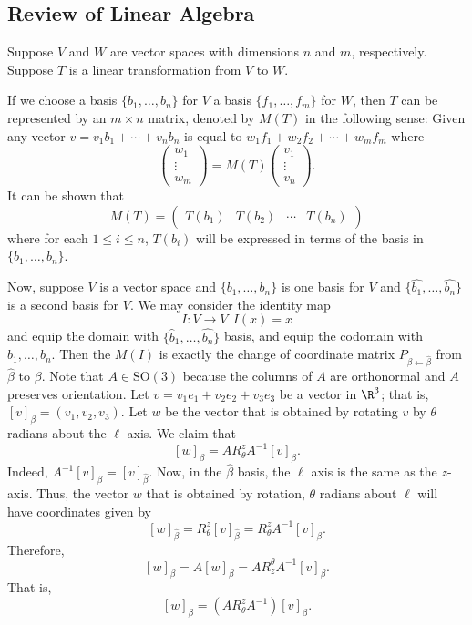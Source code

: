 \subsection{Review of Linear Algebra}

Suppose \( V  \) and \( W  \) are vector spaces with dimensions \( n  \) and \( m  \), respectively. Suppose \( T  \) is a linear transformation from \( V  \) to \( W  \). 

\begin{remark}
   If we choose a basis \(  \{  {b}_{1}, \dots, {b}_{n} \}  \) for \( V  \) a basis \( \{  {f}_{1}, \dots, {f}_{m} \}  \) for \( W  \), then \( T  \) can be represented by an \( m \times n  \) matrix, denoted by \( M(T) \) in the following sense: 
   Given any vector \( v = {v}_{1} {b}_{1} + \cdots + {v}_{n} {b}_{n} \) is equal to \( {w}_{1} {f}_{1} + {w}_{2} {f}_{2} + \cdots + {w}_{m} {f}_{m} \) where 
   \[  \begin{pmatrix} {w}_{1} \\ \vdots \\ {w}_{m} \end{pmatrix}  = M (T) \begin{pmatrix} {v}_{1} \\ \vdots \\ {v}_{n} \end{pmatrix}. \]
   It can be shown that 
   \[  M(T) = \begin{pmatrix} T({b}_{1}) & T({b}_{2}) & \cdots & T({b}_{n}) \end{pmatrix}  \]
   where for each \( 1 \leq i \leq n  \), \( T({b}_{i}) \) will be expressed in terms of the basis in \( \{  {b}_{1}, \dots, {b}_{n} \}  \). 

   Now, suppose \( V  \) is a vector space and \( \{  {b}_{1}, \dots, {b}_{n}  \} \) is one basis for \( V  \) and \( \{ \hat{{b}_{1}}, \dots, \hat{{b}_{n}} \}  \) is a second basis for \( V  \). We may consider the identity map
   \[  I : V \to V  \ \ I(x) = x  \]
   and equip the domain with \( \{ {\hat{b}}_{1} , \dots, \hat{{b}_{n}} \}  \) basis, and equip the codomain with \( {b}_{1}, \dots, {b}_{n} \). Then the \( M(I) \) is exactly the change of coordinate matrix \( P_{\beta \leftarrow \hat{\beta}} \) from \( \hat{\beta} \) to \( \beta  \). Note that \( A \in \text{SO}(3) \) because the columns of \( A  \) are orthonormal and \( A  \) preserves orientation. Let \( v = {v}_{1} {e}_{1} +  {v}_{2} {e}_{2} + {v}_{3} {e}_{3}  \) be a vector in \( \R^{3} \); that is, \( [v]_{\beta} = ({v}_{1}, {v}_{2}, {v}_{3})\). Let \( w  \) be the vector that is obtained by rotating \( v  \) by \( \theta  \) radians about the \( \ell  \) axis. We claim that 
   \[  [w]_{\beta} = A {R}_{\theta}^{z}  A^{-1} [v]_{\beta}. \]
   Indeed, \( A^{-1} [v]_{\beta} = [v]_{\hat{\beta}} \). Now, in the \( \hat{\beta} \) basis, the \( \ell  \) axis is the same as the \( z  \)-axis. Thus, the vector \( w  \) that is obtained by rotation, \( \theta  \) radians about \( \ell  \) will have coordinates given by 
   \[  [w]_{\hat{\beta}} = {R}_{\theta}^{z} [v]_{\hat{\beta}} = {R}_{\theta}^{z} A^{-1} [v]_{\beta}. \]
   Therefore, 
   \[  [w]_{\beta} = A[w]_{\beta} = A {R}_{z}^{\theta} A^{-1} [v]_{\beta}. \]
   That is, 
   \[  [w]_{\beta} = (A {R}_{\theta}^{z} A^{-1}) [v]_{\beta}. \]


\end{remark}
